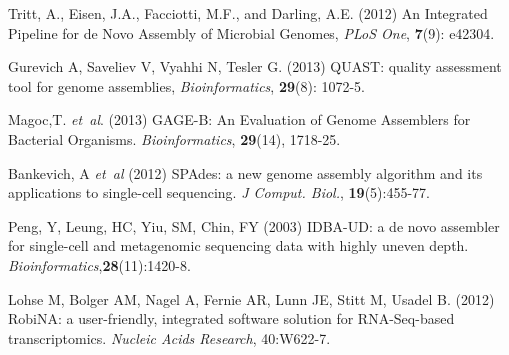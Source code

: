 \documentclass{bioinfo}
\begin{document}
\begin{thebibliography}{}
Tritt, A., Eisen, J.A., Facciotti, M.F., and Darling, A.E. (2012) An Integrated Pipeline for de Novo Assembly of Microbial Genomes, {\it PLoS One}, {\bf 7}(9): e42304.

Gurevich A, Saveliev V, Vyahhi N, Tesler G. (2013) QUAST: quality assessment tool for genome assemblies, {\it Bioinformatics}, {\bf 29}(8): 1072-5.

Magoc,T. \textit{et~al}. (2013) GAGE-B: An Evaluation of Genome Assemblers for Bacterial Organisms. \textit{Bioinformatics}, \textbf{29}(14), 1718-25.

Bankevich, A \textit{et~al} (2012) SPAdes: a new genome assembly algorithm and its applications to single-cell sequencing. \textit{J Comput. Biol.}, \textbf{19}(5):455-77.

Peng, Y, Leung, HC, Yiu, SM, Chin, FY (2003) IDBA-UD: a de novo assembler for single-cell and metagenomic sequencing data with highly uneven depth. \textit{Bioinformatics},\textbf{28}(11):1420-8.

Lohse M, Bolger AM, Nagel A, Fernie AR, Lunn JE, Stitt M, Usadel B. (2012) RobiNA: a user-friendly, integrated software solution for RNA-Seq-based transcriptomics. \textit{Nucleic Acids Research}, 40:W622-7.


\end{thebibliography}
\end{document}
